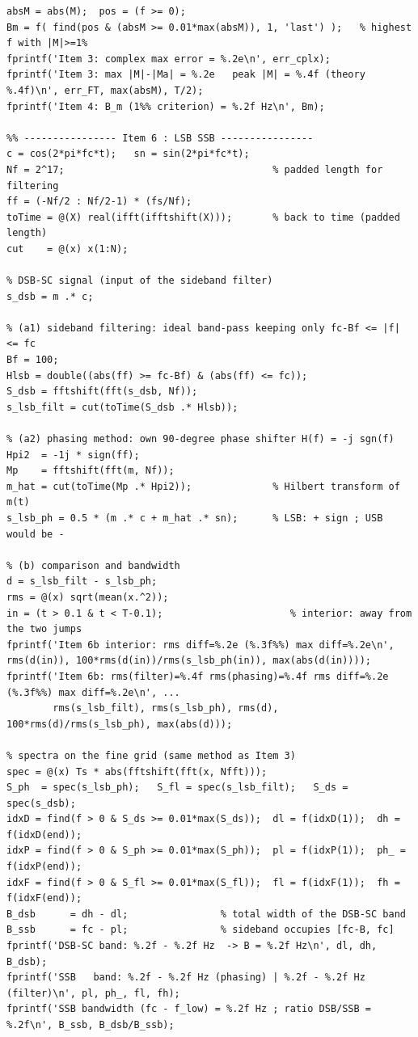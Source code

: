\documentclass[a4paper]{article}
\begin{document}
\begin{lstlisting}[frame=single, breaklines=true, basicstyle=\ttfamily\scriptsize]
%% ---------------- Item 4 : 1% bandwidth ----------------
absM = abs(M);  pos = (f >= 0);
Bm = f( find(pos & (absM >= 0.01*max(absM)), 1, 'last') );   % highest f with |M|>=1%
fprintf('Item 3: complex max error = %.2e\n', err_cplx);
fprintf('Item 3: max |M|-|Ma| = %.2e   peak |M| = %.4f (theory %.4f)\n', err_FT, max(absM), T/2);
fprintf('Item 4: B_m (1%% criterion) = %.2f Hz\n', Bm);

%% ---------------- Item 6 : LSB SSB ----------------
c = cos(2*pi*fc*t);   sn = sin(2*pi*fc*t);
Nf = 2^17;                                    % padded length for filtering
ff = (-Nf/2 : Nf/2-1) * (fs/Nf);
toTime = @(X) real(ifft(ifftshift(X)));       % back to time (padded length)
cut    = @(x) x(1:N);

% DSB-SC signal (input of the sideband filter)
s_dsb = m .* c;

% (a1) sideband filtering: ideal band-pass keeping only fc-Bf <= |f| <= fc
Bf = 100;
Hlsb = double((abs(ff) >= fc-Bf) & (abs(ff) <= fc));
S_dsb = fftshift(fft(s_dsb, Nf));
s_lsb_filt = cut(toTime(S_dsb .* Hlsb));

% (a2) phasing method: own 90-degree phase shifter H(f) = -j sgn(f)
Hpi2  = -1j * sign(ff);
Mp    = fftshift(fft(m, Nf));
m_hat = cut(toTime(Mp .* Hpi2));              % Hilbert transform of m(t)
s_lsb_ph = 0.5 * (m .* c + m_hat .* sn);      % LSB: + sign ; USB would be -

% (b) comparison and bandwidth
d = s_lsb_filt - s_lsb_ph;
rms = @(x) sqrt(mean(x.^2));
in = (t > 0.1 & t < T-0.1);                      % interior: away from the two jumps
fprintf('Item 6b interior: rms diff=%.2e (%.3f%%) max diff=%.2e\n', rms(d(in)), 100*rms(d(in))/rms(s_lsb_ph(in)), max(abs(d(in))));
fprintf('Item 6b: rms(filter)=%.4f rms(phasing)=%.4f rms diff=%.2e (%.3f%%) max diff=%.2e\n', ...
        rms(s_lsb_filt), rms(s_lsb_ph), rms(d), 100*rms(d)/rms(s_lsb_ph), max(abs(d)));

% spectra on the fine grid (same method as Item 3)
spec = @(x) Ts * abs(fftshift(fft(x, Nfft)));
S_ph  = spec(s_lsb_ph);   S_fl = spec(s_lsb_filt);   S_ds = spec(s_dsb);
idxD = find(f > 0 & S_ds >= 0.01*max(S_ds));  dl = f(idxD(1));  dh = f(idxD(end));
idxP = find(f > 0 & S_ph >= 0.01*max(S_ph));  pl = f(idxP(1));  ph_ = f(idxP(end));
idxF = find(f > 0 & S_fl >= 0.01*max(S_fl));  fl = f(idxF(1));  fh = f(idxF(end));
B_dsb      = dh - dl;                % total width of the DSB-SC band
B_ssb      = fc - pl;                % sideband occupies [fc-B, fc]
fprintf('DSB-SC band: %.2f - %.2f Hz  -> B = %.2f Hz\n', dl, dh, B_dsb);
fprintf('SSB   band: %.2f - %.2f Hz (phasing) | %.2f - %.2f Hz (filter)\n', pl, ph_, fl, fh);
fprintf('SSB bandwidth (fc - f_low) = %.2f Hz ; ratio DSB/SSB = %.2f\n', B_ssb, B_dsb/B_ssb);


\end{lstlisting}
\end{document}
